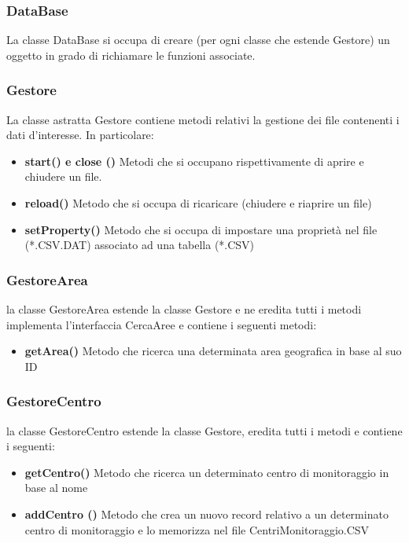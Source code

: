 \documentclass[a4paper, 12pt,twoside]{article}
\begin{document}
			\subsubsection{DataBase}
			La classe DataBase si occupa di creare (per ogni classe che estende Gestore) un oggetto in grado di richiamare le funzioni associate.
				
			\subsubsection{Gestore}
			La classe astratta Gestore contiene metodi relativi la gestione dei file contenenti i dati d'interesse. In particolare:
			\begin{itemize}
				\item \textbf{start() e close ()}
				Metodi che si occupano rispettivamente di aprire e chiudere un file.
				\item \textbf{reload()}
				Metodo che si occupa di ricaricare (chiudere e riaprire un file)
				\item  \textbf{setProperty()}
				Metodo che si occupa di impostare una proprietà nel file (*.CSV.DAT) associato ad una tabella (*.CSV)
			\end{itemize}
			
			\newpage
				
			
				
			\subsubsection{GestoreArea}
			la classe GestoreArea estende la classe Gestore e ne eredita tutti i metodi
			implementa l'interfaccia CercaAree e contiene i seguenti metodi:
			\begin{itemize}
				\item \textbf{getArea()}
				Metodo che ricerca una determinata area geografica in base al suo ID
			\end{itemize}
			
			\subsubsection{GestoreCentro}
			la classe GestoreCentro estende la classe Gestore, eredita tutti i metodi e contiene i seguenti:
			\begin{itemize}
				\item \textbf{getCentro()}
				Metodo che ricerca un determinato centro di monitoraggio in base al nome
				\item \textbf {addCentro ()}
				Metodo che crea un nuovo record relativo a un determinato centro di monitoraggio e lo memorizza nel file CentriMonitoraggio.CSV
			\end{itemize}
			
\end{document}
